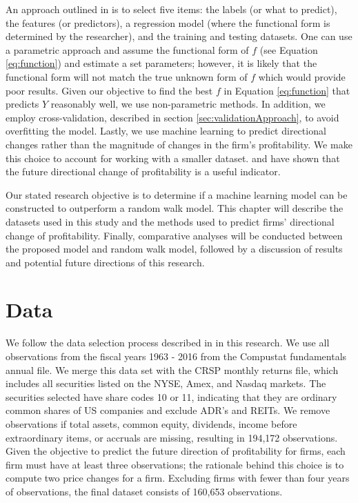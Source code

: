 An approach outlined in \cite{Monahan} is to select five items: the labels (or what to predict), the features (or predictors), a regression model (where the functional form is determined by the researcher),  and the training and testing datasets.  One can use a parametric approach and assume the functional form of \(f\) (see Equation \ref{eq:function}) and estimate a set parameters; however,  it is likely that the functional form will not match the true unknown form of \(f\) which would provide poor results.  Given our objective to find the best \(f\) in Equation \ref{eq:function} that predicts \(Y\) reasonably well, we use non-parametric methods.  In addition, we employ cross-validation, described in section \ref{sec:validationApproach}, to avoid overfitting the model.  Lastly, we use machine learning to predict directional changes rather than the magnitude of changes in the firm's profitability. We make this choice to account for working with a smaller dataset.  \cite{BB68} and \cite{OU1989295} have shown that the future directional change of profitability is a useful indicator. 

Our stated research objective is to determine if a machine learning model can be constructed to outperform a random walk model.  This chapter will describe the datasets used in this study and the methods used to predict firms' directional change of profitability.  Finally, comparative analyses will be conducted between the proposed model and random walk model, followed by a discussion of results and potential future directions of this research.

\section{Data} \label{sec:ABIS:Data}

We follow the data selection process described in \cite{HOU2012504} in this research. We use all observations from the fiscal years 1963 - 2016 from the Compustat fundamentals annual file. We merge this data set with the CRSP monthly returns file, which includes all securities listed on the NYSE,  Amex,  and Nasdaq markets. The securities selected have share codes 10 or 11, indicating that they are ordinary common shares of US companies and exclude ADR's and REITs. We remove observations if total assets, common equity, dividends, income before extraordinary items,  or accruals are missing, resulting in 194,172 observations.  Given the objective to predict the future direction of profitability for firms, each firm must have at least three observations; the rationale behind this choice is to compute two price changes for a firm. Excluding firms with fewer than four years of observations, the final dataset consists of 160,653 observations. 

